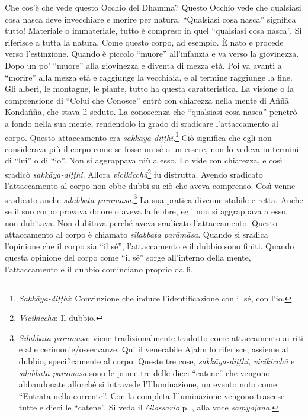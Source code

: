 Che cos'è che vede questo Occhio del Dhamma? Questo Occhio vede che
qualsiasi cosa nasca deve invecchiare e morire per natura. ``Qualsiasi
cosa nasca'' significa tutto! Materiale o immateriale, tutto è compreso
in quel ``qualsiasi cosa nasca''. Si riferisce a tutta la natura. Come
questo corpo, ad esempio. È nato e procede verso l'estinzione. Quando è
piccolo ``muore'' all'infanzia e va verso la giovinezza. Dopo un po'
``muore'' alla giovinezza e diventa di mezza età. Poi va avanti a
``morire'' alla mezza età e raggiunge la vecchiaia, e al termine
raggiunge la fine. Gli alberi, le montagne, le piante, tutto ha questa
caratteristica. La visione o la comprensione di ``Colui che Conosce''
entrò con chiarezza nella mente di Aññā Kondañña, che stava lì seduto.
La conoscenza che ``qualsiasi cosa nasca'' penetrò a fondo nella sua
mente, rendendolo in grado di sradicare l'attaccamento al corpo. Questo
attaccamento era \emph{sakkāya-diṭṭhi}.\footnote{\emph{Sakkāya-diṭṭhi}:
  Convinzione che induce l'identificazione con il sé, con l'io.} Ciò
significa che egli non considerava più il corpo come se fosse un sé o un
essere, non lo vedeva in termini di ``lui'' o di ``io''. Non si
aggrappava più a esso. Lo vide con chiarezza, e così sradicò
\emph{sakkāya-diṭṭhi}. Allora \emph{vicikicchā}\footnote{\emph{Vicikicchā}:
  Il dubbio.} fu distrutta. Avendo sradicato l'attaccamento al corpo non
ebbe dubbi su ciò che aveva comprenso. Così venne sradicato anche
\emph{sīlabbata parāmāsa}.\footnote{\emph{Sīlabbata parāmāsa}: viene
  tradizionalmente tradotto come attaccamento ai riti e alle
  cerimonie/osservanze. Qui il venerabile Ajahn lo riferisce, assieme al
  dubbio, specificamente al corpo. Queste tre cose,
  \emph{sakkāya-diṭṭhi}, \emph{vicikicchā} e \emph{sīlabbata parāmāsa}
  sono le prime tre delle dieci ``catene'' che vengono abbandonate
  allorché si intravede l'Illuminazione, un evento noto come ``Entrata
  nella corrente''. Con la completa Illuminazione vengono trascese tutte
  e dieci le ``catene''. Si veda il \emph{Glossario} p. \pageref{glossary-samyojana}, alla voce
  \emph{saṃyojana}.} La sua pratica divenne stabile e retta. Anche se il
suo corpo provava dolore o aveva la febbre, egli non si aggrappava a
esso, non dubitava. Non dubitava perché aveva sradicato l'attaccamento.
Questo attaccamento al corpo è chiamato \emph{sīlabbata parāmāsa}.
Quando si sradica l'opinione che il corpo sia ``il sé'', l'attaccamento
e il dubbio sono finiti. Quando questa opinione del corpo come ``il sé''
sorge all'interno della mente, l'attaccamento e il dubbio cominciano
proprio da lì.

